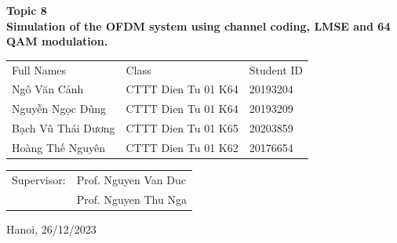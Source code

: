 \begin{center}
    \textbf{\fontsize{21pt}{0pt}\selectfont Topic 8 \\}
    \textbf{\fontsize{21pt}{0pt}\selectfont Simulation of the OFDM system using channel coding, LMSE and 64 QAM modulation. }
\vspace{7pt}
\begin{table}[H]
    \centering
    \begin{tabular}{l l l}
        Full Names          & Class                 & Student ID \\
        Ngô Văn Cảnh        & CTTT Dien Tu 01 K64   & 20193204 \\
        Nguyễn Ngọc Dũng    & CTTT Dien Tu 01 K64   & 20193209 \\
        Bạch Vũ Thái Dương  & CTTT Dien Tu 01 K65   & 20203859 \\
        Hoàng Thế Nguyên    & CTTT Dien Tu 01 K62   & 20176654 \\
    \end{tabular}
\end{table}
\vspace{1.5cm}
\begin{table}[H]
    \centering
    \begin{tabular}{l l}
        \fontsize{14pt}{0pt}\selectfont Supervisor: & Prof. Nguyen Van Duc \\
        {} & Prof. Nguyen Thu Nga \hspace{5pt} \\
    \end{tabular}
\end{table}
\vspace{1.5cm}
\fontsize{14pt}{0pt}\selectfont Hanoi, 26/12/2023
\end{center}

